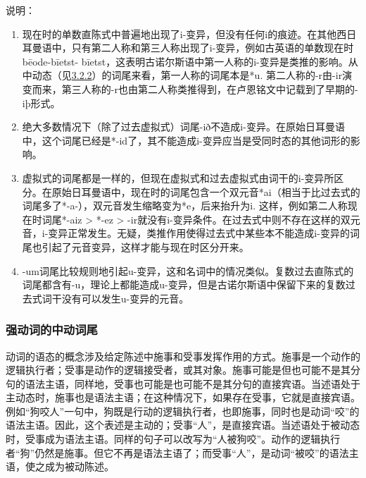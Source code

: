 说明：

\begin{enumerate}
  \def\labelenumi{\arabic{enumi})}
  \item
        现在时的单数直陈式中普遍地出现了i-变异，但没有任何i的痕迹。在其他西日耳曼语中，只有第二人称和第三人称出现了i-变异，例如古英语的单数现在时bēode-bīetst-
        bīetst，这表明古诺尔斯语中第一人称的i-变异是类推的影响。从中动态（见\hyperref[ux5f3aux52a8ux8bcdux7684ux4e2dux52a8ux8bcdux5c3e]{3.2.2}）的词尾来看，第一人称的词尾本是*u.
        第二人称的-r由-ir演变而来，第三人称的-r也由第二人称类推得到，在卢恩铭文中记载到了早期的-iþ形式。
  \item
        绝大多数情况下（除了过去虚拟式）词尾-ið不造成i-变异。在原始日耳曼语中，这个词尾已经是*-id了，其不能造成i-变异应当是受同时态的其他词形的影响。
  \item
        \label{_Ref116919964}{}虚拟式的词尾都是一样的，但现在虚拟式和过去虚拟式由词干的i-变异所区分。在原始日耳曼语中，现在时的词尾包含一个双元音*ai（相当于比过去式的词尾多了*-a-），双元音发生缩略变为*e，后来抬升为i.
        这样，例如第二人称现在时词尾*-aiz \textgreater{} *-ez \textgreater{}
        -ir就没有i-变异条件。在过去式中则不存在这样的双元音，i-变异正常发生。无疑，类推作用使得过去式中某些本不能造成i-变异的词尾也引起了元音变异，这样才能与现在时区分开来。
  \item
        -um词尾比较规则地引起u-变异，这和名词中的情况类似。复数过去直陈式的词尾都含有-u，理论上都能造成u-变异，但是古诺尔斯语中保留下来的复数过去式词干没有可以发生u-变异的元音。
\end{enumerate}

\subsubsection{强动词的中动词尾}\label{ux5f3aux52a8ux8bcdux7684ux4e2dux52a8ux8bcdux5c3e}

动词的语态的概念涉及给定陈述中施事和受事发挥作用的方式。施事是一个动作的逻辑执行者；受事是动作的逻辑接受者，或其对象。施事可能是但也可能不是其分句的语法主语，同样地，受事也可能是也可能不是其分句的直接宾语。当述语处于主动态时，施事也是语法主语；在这种情况下，如果存在受事，它就是直接宾语。例如``狗咬人''一句中，狗既是行动的逻辑执行者，也即施事，同时也是动词``咬''的语法主语。因此，这个表述是主动的；受事``人''，是直接宾语。当述语处于被动态时，受事成为语法主语。同样的句子可以改写为``人被狗咬''。动作的逻辑执行者``狗''仍然是施事。但它不再是语法主语了；而受事``人''，是动词``被咬''的语法主语，使之成为被动陈述。

